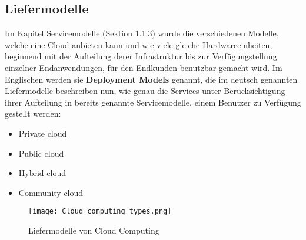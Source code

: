 \subsection{Liefermodelle}
Im Kapitel Servicemodelle (Sektion 1.1.3) wurde die verschiedenen Modelle, welche eine Cloud anbieten kann und wie viele gleiche Hardwareeinheiten, beginnend mit der Aufteilung derer Infrastruktur bis zur Verfügungstellung einzelner Endanwendungen, für den Endkunden benutzbar gemacht wird.\newline
Im Englischen werden sie \textbf{Deployment Models} genannt, die im deutsch genannten Liefermodelle beschreiben nun, wie genau die Services unter Berücksichtigung ihrer Aufteilung in bereits genannte Servicemodelle, einem Benutzer zu Verfügung gestellt werden:
\begin{itemize}
	\item Private cloud
	\item Public cloud
	\item Hybrid cloud
	\item Community cloud
\end{itemize}

\begin{center}
\begin{figure}[h]
    \centering
    \texttt{[image: Cloud\_computing\_types.png]}
    \caption{Liefermodelle von Cloud Computing}
\end{figure}
\end{center}

